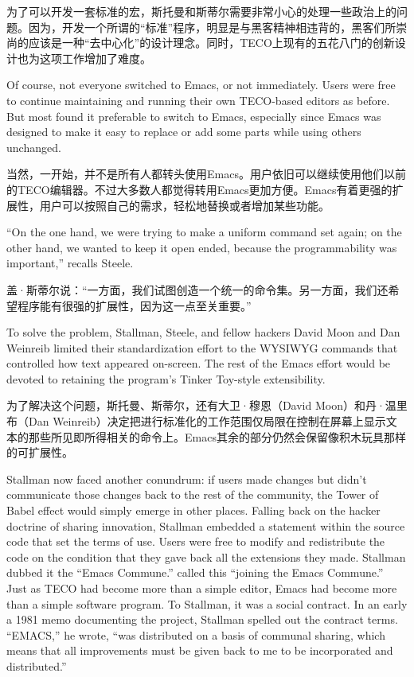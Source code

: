 \ifdefined\chs
为了可以开发一套标准的宏，斯托曼和斯蒂尔需要非常小心的处理一些政治上的问题。因为，开发一个所谓的``标准''程序，明显是与黑客精神相违背的，黑客们所崇尚的应该是一种``去中心化''的设计理念。同时，TECO上现有的五花八门的创新设计也为这项工作增加了难度。
\fi
\fi

\ifdefined\vtwo
\ifdefined\eng
Of course, not everyone switched to Emacs, or not immediately.  Users were free to continue maintaining and running their own TECO-based editors as before.  But most found it preferable to switch to Emacs, especially since Emacs was designed to make it easy to replace or add some parts while using others unchanged.
\fi

\ifdefined\chs
当然，一开始，并不是所有人都转头使用Emacs。用户依旧可以继续使用他们以前的TECO编辑器。不过大多数人都觉得转用Emacs更加方便。Emacs有着更强的扩展性，用户可以按照自己的需求，轻松地替换或者增加某些功能。
\fi
\fi

\ifdefined\eng
``On the one hand, we were trying to make a uniform command set again; on the other hand, we wanted to keep it open ended, because the programmability was important,'' recalls Steele.
\fi

\ifdefined\chs
盖·斯蒂尔说：``一方面，我们试图创造一个统一的命令集。另一方面，我们还希望程序能有很强的扩展性，因为这一点至关重要。''
\fi

\ifdefined\vone
\ifdefined\eng
To solve the problem, Stallman, Steele, and fellow hackers David Moon and Dan Weinreib limited their standardization effort to the WYSIWYG commands that controlled how text appeared on-screen. The rest of the Emacs effort would be devoted to retaining the program's Tinker Toy-style extensibility.
\fi

\ifdefined\chs
为了解决这个问题，斯托曼、斯蒂尔，还有大卫·穆恩（David Moon）和丹·温里布（Dan Weinreib）决定把进行标准化的工作范围仅局限在控制在屏幕上显示文本的那些所见即所得相关的命令上。Emacs其余的部分仍然会保留像积木玩具那样的可扩展性。
\fi
\fi

\ifdefined\eng
Stallman now faced another conundrum: if users made changes but didn't communicate those changes back to the rest of the community, the Tower of Babel effect would simply emerge in other places. Falling back on the hacker doctrine of sharing innovation, Stallman embedded a statement within the source code that set the terms of use. Users were free to modify and redistribute the code on the condition that they gave back all the extensions they made. Stallman \ifdefined\vone dubbed it the ``Emacs Commune.'' \fi\ifdefined\vtwo called this ``joining the Emacs Commune.'' \fi Just as TECO had become more than a simple editor, Emacs had become more than a simple software program. To Stallman, it was a social contract. In \ifdefined\vone an early \fi\ifdefined\vtwo a 1981 \fi memo documenting the project, Stallman spelled out the contract terms. ``EMACS,'' he wrote, ``was distributed on a basis of communal sharing, which means that all improvements must be given back to me to be incorporated and distributed.''
\fi

